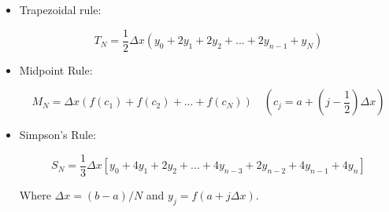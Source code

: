 \documentclass[11pt]{article}
\begin{document}
		\begin{itemize}
		
		\item Trapezoidal rule:
		
		\begin{equation*}
		T_N = \frac{1}{2}\Delta x(y_0 + 2y_1 + 2y_2 + ... + 2y_{n - 1} + y_N)
		\end{equation*}
		
		\item Midpoint Rule:
		
		\begin{equation*}
		M_N = \Delta x (f(c_1) + f(c_2) + ... + f(c_N)) \quad  (c_j = a + (j - \frac{1}{2}) \Delta x)
		\end{equation*}
		
		\item Simpson's Rule:
		
		\begin{equation*}
		S_N = \frac{1}{3}\Delta x [y_0 + 4y_1 + 2y_2 + ... + 4y_{n-3} + 2y_{n-2} + 4y_{n-1} + 4y_{n}]
		\end{equation*}
		
		\begin{flushright}
		Where $\Delta x = (b - a) / N$ and $y_j = f(a + j\Delta x)$.
		\end{flushright}
		
		\end{itemize}
		
\end{document}
